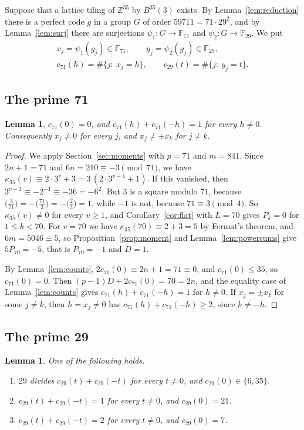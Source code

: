 \documentclass{amsart}
\newtheorem{lemma}[theorem]{Lemma}
\theoremstyle{definition}
\theoremstyle{remark}
\numberwithin{equation}{section}
\newcommand{\Z}{\mathbb{Z}}
\newcommand{\F}{\mathbb{F}}
\begin{document}
Suppose that a lattice tiling of $\Z^{35}$ by $B^{35}(3)$ exists. By Lemma~\ref{lem:reduction} there is a perfect code $g$ in a group $G$ of order $59711=71\cdot29^2$, and by Lemma~\ref{lem:surj} there are surjections $\psi_1\colon G\to\F_{71}$ and $\psi_2\colon G\to\F_{29}$. We put
\begin{gather*}
x_j=\psi_1(g_j)\in\F_{71},\qquad y_j=\psi_2(g_j)\in\F_{29},\\
c_{71}(h)=\#\{j:\ x_j=h\},\qquad c_{29}(t)=\#\{j:\ y_j=t\}.
\end{gather*}

\subsection{The prime 71}

\begin{lemma}\label{lem:71}
$c_{71}(0)=0$, and $c_{71}(h)+c_{71}(-h)=1$ for every $h\ne0$. Consequently $x_j\ne0$ for every $j$, and $x_j\ne\pm x_k$ for $j\ne k$.
\end{lemma}

\begin{proof}
We apply Section~\ref{sec:moments} with $p=71$ and $m=841$. Since $2n+1=71$ and $6n=210\equiv-3\pmod{71}$, we have $\kappa_{35}(v)\equiv2\cdot3^v+3=3\,(2\cdot3^{v-1}+1)$. If this vanished, then $3^{v-1}\equiv-2^{-1}\equiv-36=-6^2$. But $3$ is a square modulo $71$, because $\bigl(\tfrac{3}{71}\bigr)=-\bigl(\tfrac{71}{3}\bigr)=-\bigl(\tfrac{2}{3}\bigr)=1$, while $-1$ is not, because $71\equiv3\pmod4$. So $\kappa_{35}(v)\ne0$ for every $v\ge1$, and Corollary~\ref{cor:flat} with $L=70$ gives $P_k=0$ for $1\le k<70$. For $v=70$ we have $\kappa_{35}(70)\equiv2+3=5$ by Fermat's theorem, and $6m=5046\equiv5$, so Proposition~\ref{prop:moment} and Lemma~\ref{lem:powersums} give $5P_{70}=-5$, that is $P_{70}=-1$ and $D=1$.

By Lemma~\ref{lem:counts}, $2c_{71}(0)\equiv2n+1=71\equiv0$, and $c_{71}(0)\le35$, so $c_{71}(0)=0$. Then $(p-1)D+2c_{71}(0)=70=2n$, and the equality case of Lemma~\ref{lem:counts} gives $c_{71}(h)+c_{71}(-h)=1$ for $h\ne0$. If $x_j=\pm x_k$ for some $j\ne k$, then $h=x_j\ne0$ has $c_{71}(h)+c_{71}(-h)\ge2$, since $h\ne-h$.
\end{proof}

\subsection{The prime 29}

\begin{lemma}\label{lem:29}
One of the following holds.
\begin{enumerate}
\item[(a)] $29$ divides $c_{29}(t)+c_{29}(-t)$ for every $t\ne0$, and $c_{29}(0)\in\{6,35\}$.
\item[(b)] $c_{29}(t)+c_{29}(-t)=1$ for every $t\ne0$, and $c_{29}(0)=21$.
\item[(c)] $c_{29}(t)+c_{29}(-t)=2$ for every $t\ne0$, and $c_{29}(0)=7$.
\end{enumerate}
\end{lemma}
\end{document}
